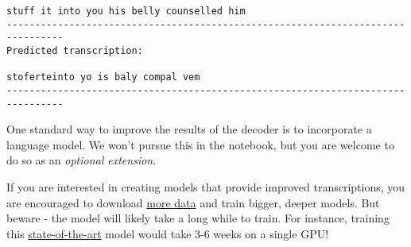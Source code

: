 \documentclass[11pt]{article}
\begin{document}
\begin{Verbatim}[commandchars=\\\{\}]
stuff it into you his belly counselled him
--------------------------------------------------------------------------------
Predicted transcription:

stoferteinto yo is baly compal vem
--------------------------------------------------------------------------------

    \end{Verbatim}

    One standard way to improve the results of the decoder is to incorporate
a language model. We won't pursue this in the notebook, but you are
welcome to do so as an \emph{optional extension}.

If you are interested in creating models that provide improved
transcriptions, you are encouraged to download
\href{http://www.openslr.org/12/}{more data} and train bigger, deeper
models. But beware - the model will likely take a long while to train.
For instance, training this
\href{https://arxiv.org/pdf/1512.02595v1.pdf}{state-of-the-art} model
would take 3-6 weeks on a single GPU!


    
    
    
    
\end{document}

